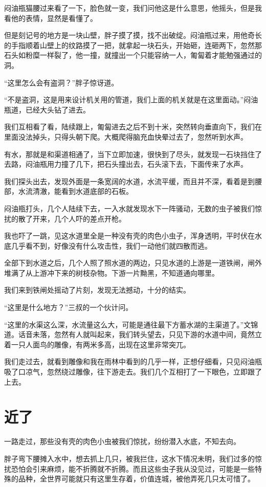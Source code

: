 闷油瓶猫腰过来看了一下，脸色就一变，我们问他这是什么意思，他摇头，但是我看他的表情，显然是看懂了。

但是刻记号的地方是一块山壁，胖子摸了摸，找不出破绽。闷油瓶过来，用他奇长的手指顺着山壁上的纹路摸了一把，就拿起一块石头，开始砸，连砸两下，忽然那石头如粉糜一样裂了，他一撞，就撞出一个只能容纳一人，匍匐着才能勉强通过的洞。

“这里怎么会有盗洞？”胖子惊讶道。

“不是盗洞，这是用来设计机关用的管道，我们上面的机关就是在这里面动。”闷油瓶道，已经大头钻了进去。

我们互相看了看，陆续跟上，匍匐进去之后不到十米，突然转向垂直向下，我们在里面没法掉头，只得头朝下爬。大概爬得脑充血快晕过去了，忽然听到水声。

有水，那就是和渠道相通了，当下立即加速，很快到了尽头，就发现一石块挡住了去路，闷油瓶用力撞了几下，把石头撞出去，石头滚下去，下面传来了水声。

我们探头出去，发现外面是一条宽阔的水道，水流平缓，而且并不深，看着是到腰部，水流清澈，能看到水道底部的石板。

闷油瓶打头，几个人陆续下去，一入水就发现水下一阵骚动，无数的虫子被我们惊扰的散了开来，几个人吓的差点开枪。

我也吓了一跳，见这水道里全是一种没有壳的肉色小虫子，浑身透明，平时伏在水底几乎看不到，好像没有什么攻击性，我们一动他们就四散而逃。

全部下到水道之后，几个人照了照水道的两边，只见水道的上游是一道铁闸，闸外堆满了从上游冲下来的树枝杂物。下游一片黝黑，不知道通向哪里。

我们来到铁闸处摇动了片刻，发现无法撼动，十分的结实。

“这里是什么地方？”三叔的一个伙计问。

“这里的水渠这么深，水流量这么大，可能是通往最下方蓄水湖的主渠道了。”文锦道。话音未落，忽然有人就叫起来，我们转头望去，只见下游的水道中间，竟然立着一只人面鸟的雕像，有两米多高，出现在这里非常突兀。

我们走过去，就看到雕像和我在雨林中看到的几乎一样，正想仔细看，只见闷油瓶吸了口凉气，忽然绕过雕像，往下游走去。我们几个互相打了一下眼色，立即跟了上去。

\chapter{近了}

一路走过，那些没有壳的肉色小虫被我们惊扰，纷纷潜入水底，不知去向。

胖子弯下腰摊入水中，想去抓上几只，被我拦住，这水下情况未明，我们过多的惊扰恐怕会引来麻烦，能不折腾就不折腾。而且这些虫子我从没见过，可能是一些特殊的品种，全世界可能就只有这里生存着，价值连城，被他弄死几只太可惜了。

